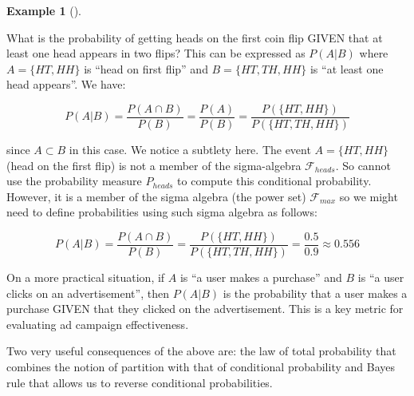 \documentclass[
  letterpaper,
]{scrbook}
\theoremstyle{definition}
\theoremstyle{plain}
\theoremstyle{plain}
\theoremstyle{definition}
\newtheorem{example}{Example}[chapter]
\theoremstyle{remark}
\begin{document}
\begin{tcolorbox}[enhanced jigsaw, bottomtitle=1mm, coltitle=black, toprule=.15mm, toptitle=1mm, bottomrule=.15mm, colback=white, arc=.35mm, opacityback=0, breakable, title={Example of Conditional Probability}, titlerule=0mm, rightrule=.15mm, colbacktitle=quarto-callout-note-color!10!white, colframe=quarto-callout-note-color-frame, opacitybacktitle=0.6, leftrule=.75mm, left=2mm]

\begin{example}[]\protect\hypertarget{exm-cond-probability}{}\label{exm-cond-probability}

What is the probability of getting heads on the first coin flip GIVEN
that at least one head appears in two flips? This can be expressed as
\(P(A|B)\) where \(A=\{HT,HH\}\) is ``head on first flip'' and
\(B=\{HT,TH,HH\}\) is ``at least one head appears''. We have:

\[
P(A|B) = \frac{P(A \cap B)}{P(B)} =\frac{P(A)}{P(B)}= \frac{P(\{HT,HH\})}{P(\{HT,TH,HH\})} 
\]

since \(A\subset B\) in this case. We notice a subtlety here. The event
\(A =\{HT,HH\}\) (head on the first flip) is not a member of the
sigma-algebra \(\mathcal F_{heads}\). So cannot use the probability
measure \(P_{heads}\) to compute this conditional probability. However,
it is a member of the sigma algebra (the power set) \(\mathcal F_{max}\)
so we might need to define probabilities using such sigma algebra as
follows:

\[
P(A|B) = \frac{P(A \cap B)}{P(B)} = \frac{P(\{HT,HH\})}{P(\{HT,TH,HH\})} = 
 \frac{0.5}{0.9} \approx 0.556
\]

On a more practical situation, if \(A\) is ``a user makes a purchase''
and \(B\) is ``a user clicks on an advertisement'', then \(P(A|B)\) is
the probability that a user makes a purchase GIVEN that they clicked on
the advertisement. This is a key metric for evaluating ad campaign
effectiveness.

\end{example}

\end{tcolorbox}

Two very useful consequences of the above are: the law of total
probability that combines the notion of partition with that of
conditional probability and Bayes rule that allows us to reverse
conditional probabilities.
\end{document}
